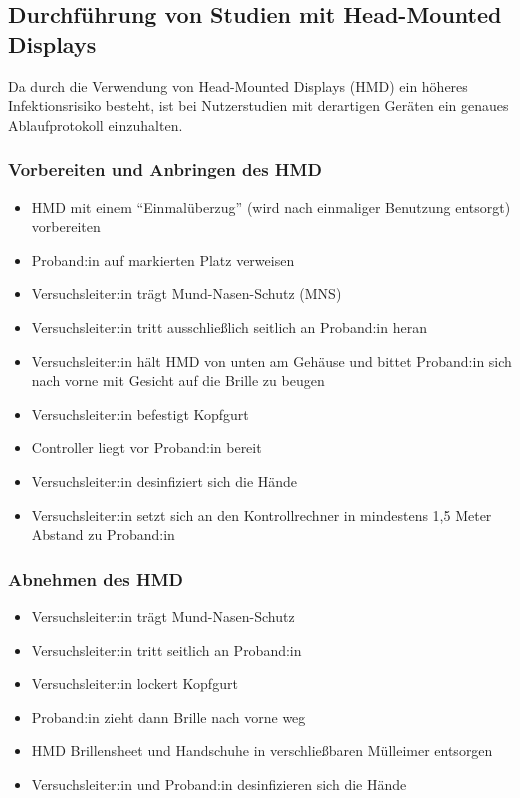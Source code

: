 \subsection{Durchführung von Studien mit Head-Mounted Displays}\label{subsec:nutzerstudien_hmd}

Da durch die Verwendung von Head-Mounted Displays (HMD) ein höheres Infektionsrisiko besteht, ist bei Nutzerstudien mit derartigen Geräten ein genaues Ablaufprotokoll einzuhalten.

\subsubsection*{Vorbereiten und Anbringen des HMD}

{
\singlespacing
\begin{itemize}
    \item HMD mit einem “Einmalüberzug” (wird nach einmaliger Benutzung entsorgt) vorbereiten
    \item Proband:in auf markierten Platz verweisen 
    \item Versuchsleiter:in trägt Mund-Nasen-Schutz (MNS)
    \item Versuchsleiter:in tritt ausschließlich seitlich an Proband:in heran
    \item Versuchsleiter:in hält HMD von unten am Gehäuse und bittet Proband:in sich nach vorne mit Gesicht auf die Brille zu beugen 
    \item Versuchsleiter:in befestigt Kopfgurt 
    \item Controller liegt vor Proband:in bereit 
    \item Versuchsleiter:in desinfiziert sich die Hände
    \item Versuchsleiter:in setzt sich an den Kontrollrechner in mindestens 1,5 Meter Abstand zu Proband:in
\end{itemize}
}

\subsubsection*{Abnehmen des HMD}

{
\singlespacing
\begin{itemize}
    \item Versuchsleiter:in trägt Mund-Nasen-Schutz
    \item Versuchsleiter:in tritt seitlich an Proband:in
    \item Versuchsleiter:in lockert Kopfgurt
    \item Proband:in zieht dann Brille nach vorne weg
    \item HMD Brillensheet und Handschuhe in verschließbaren Mülleimer entsorgen
    \item Versuchsleiter:in und Proband:in desinfizieren sich die Hände
\end{itemize}
}

